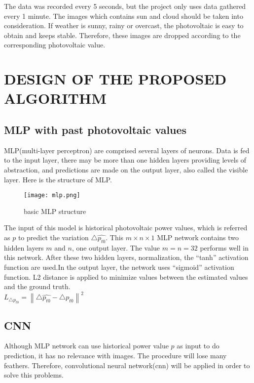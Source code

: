 \documentclass{elegantpaper}
\begin{document}
The data was recorded every 5 seconds, but the project only uses data gathered every 1 minute. The images which contains sun and cloud should be taken into consideration. If weather is sunny, rainy or overcast, the photovoltaic is easy to obtain and keeps stable. Therefore, these images are dropped according to the corresponding photovoltaic value.\\[2ex]


\section{DESIGN OF THE PROPOSED ALGORITHM}


\subsection{MLP with past photovoltaic values}
MLP(multi-layer perceptron) are comprised several layers of neurons. Data is fed to the input layer, there may be more than one hidden layers providing levels of abstraction, and predictions are made on the output layer, also called the visible layer.\cite{yilmaz2009pitch} Here is the structure of MLP.

\begin{figure}[!ht]
	\centering
	\texttt{[image: mlp.png]}
	\caption{basic MLP structure\label{fig:mlp}}
\end{figure}



The input of this model is historical photovoltaic power values, which is referred as $p$ to predict the variation $\bigtriangleup \hat{p_{t0}}$. This $m\times n \times 1$ MLP network contains two hidden layers $m$ and $n$, one output layer. The value $m = n = 32$ performs well in this network. After these two hidden layers, normalization, the “tanh” activation function are used.In the output layer, the network uses “sigmoid” activation function. L2 distance is applied to minimize values between the estimated values and the ground truth.\\[1.5ex]
$L_{\bigtriangleup p_{t0}}=\left \| \bigtriangleup \hat{p_{t0}}-\bigtriangleup p_{t0} \right \|  ^{2}$ \\


\subsection{CNN}

Although MLP network can use historical power value $p$ as input to do prediction, it has no relevance with images. The procedure will lose many feathers. Therefore, convolutional neural network(cnn) will be applied in order to solve this problems.  \\[2ex]
\end{document}
